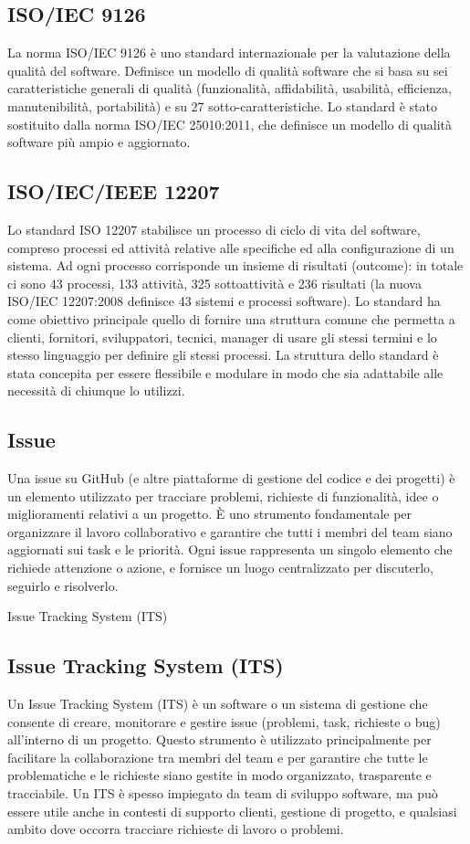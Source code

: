 \hypertarget{ISO/IEC 9126}{}
\subsection*{ISO/IEC 9126}
La norma ISO/IEC 9126 è uno standard internazionale per la valutazione della qualità del software.
Definisce un modello di qualità software che si basa su sei caratteristiche generali di qualità (funzionalità, affidabilità, usabilità, efficienza,
manutenibilità, portabilità) e su 27 sotto-caratteristiche.
Lo standard è stato sostituito dalla norma ISO/IEC 25010:2011, che definisce un modello di qualità software più ampio e aggiornato.

\hypertarget{ISO/IEC/IEEE 12207}{}
\subsection*{ISO/IEC/IEEE 12207}
Lo standard ISO 12207 stabilisce un processo di ciclo di vita del software, compreso processi ed attività relative alle specifiche ed alla configurazione di un sistema.
Ad ogni processo corrisponde un insieme di risultati (outcome): in totale ci sono 43 processi, 133 attività, 325 sottoattività e 236 risultati (la nuova ISO/IEC 12207:2008 definisce 43 sistemi e processi software).
Lo standard ha come obiettivo principale quello di fornire una struttura comune che permetta a clienti, fornitori, sviluppatori, tecnici, manager di usare gli stessi termini e lo stesso linguaggio per definire gli stessi processi.
La struttura dello standard è stata concepita per essere flessibile e modulare in modo che sia adattabile alle necessità di chiunque lo utilizzi.

\subsection*{Issue}
Una issue su GitHub (e altre piattaforme di gestione del codice e dei progetti) è un elemento utilizzato per tracciare problemi, richieste di funzionalità, 
idee o miglioramenti relativi a un progetto. È uno strumento fondamentale per organizzare il lavoro collaborativo e garantire che tutti i membri del team 
siano aggiornati sui task e le priorità. Ogni issue rappresenta un singolo elemento che richiede attenzione o azione, e fornisce un luogo centralizzato per 
discuterlo, seguirlo e risolverlo.

\hypertarget{sec:issue_tracking_system}{Issue Tracking System (ITS)}
\subsection*{Issue Tracking System (ITS)}
Un Issue Tracking System (ITS) è un software o un sistema di gestione che consente di creare, monitorare e gestire issue 
(problemi, task, richieste o bug) all'interno di un progetto. Questo strumento è utilizzato principalmente per facilitare la collaborazione 
tra membri del team e per garantire che tutte le problematiche e le richieste siano gestite in modo organizzato, trasparente e tracciabile. 
Un ITS è spesso impiegato da team di sviluppo software, ma può essere utile anche in contesti di supporto clienti, gestione di progetto, e 
qualsiasi ambito dove occorra tracciare richieste di lavoro o problemi.

\newpage